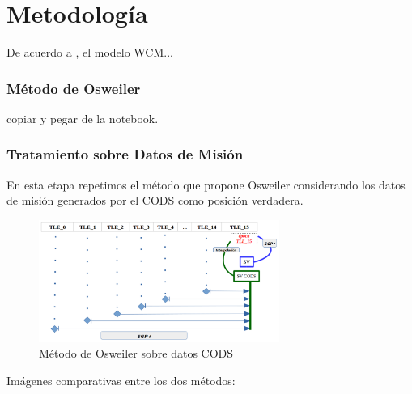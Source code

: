 \chapter{Metodología}
\label{chap:metodologia}

 De acuerdo a \cite{Barrett2009}, el modelo WCM...\\

\subsection{M\'etodo de Osweiler}
copiar y pegar de la notebook.

\subsection{Tratamiento sobre Datos de Misi\'on}
En esta etapa repetimos el m\'etodo que propone Osweiler considerando los datos de misi\'on generados por el CODS
como posici\'on verdadera. 

\begin{figure}[!h]
 \includegraphics[width=0.7\textwidth]{imagenes/Osweiler_sobre_Cods.png}
 \caption{M\'etodo de Osweiler sobre datos CODS}
\end{figure}

Im\'agenes comparativas entre los dos m\'etodos:\\

